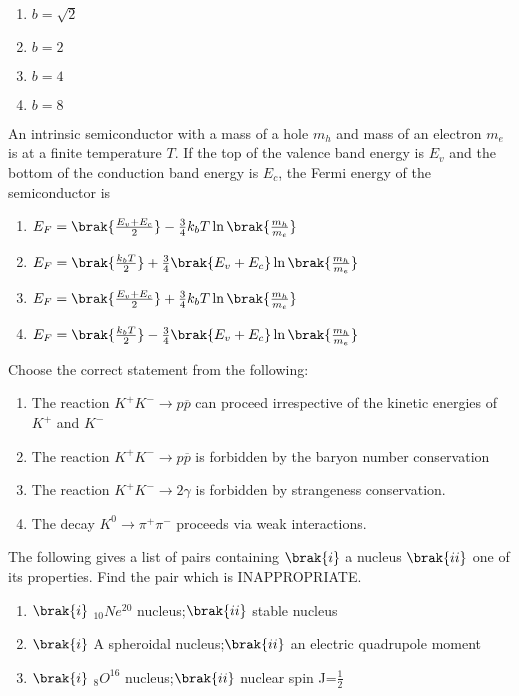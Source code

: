 {{\begin{multicols}{4}
\begin{enumerate}
\item $b=\sqrt{2}$
\item $b=2$
\item $b=4$
\item $b=8$
\end{enumerate}
\end{multicols}
}
\item{
An intrinsic semiconductor with a mass of a hole $m_h$ and mass of an electron $m_e$ is at a finite temperature $T$. If the top of the valence band energy is $E_v$ and the bottom of the conduction band energy is $E_c$, the Fermi energy of the semiconductor is  
\begin{multicols}{2}
\begin{enumerate}
\item $E_F=\brak{\frac{E_v+E_c}{2}}-\frac{3}{4}k_bT\ln\brak{\frac{m_h}{m_e}}$
\item $E_F=\brak{\frac{k_bT}{2}}+\frac{3}{4}\brak{E_v+E_c}\ln\brak{\frac{m_h}{m_e}}$
\item $E_F=\brak{\frac{E_v+E_c}{2}}+\frac{3}{4}k_bT\ln\brak{\frac{m_h}{m_e}}$
\item $E_F=\brak{\frac{k_bT}{2}}-\frac{3}{4}\brak{E_v+E_c}\ln\brak{\frac{m_h}{m_e}}$
\end{enumerate}
\end{multicols}
}
\item{
Choose the correct statement from the following:
\begin{enumerate}
\item The reaction $K^+K^-\rightarrow p\overline{p}$ can proceed irrespective of the kinetic energies of $K^+$ and $K^-$
\item The reaction $K^+K^-\rightarrow p\overline{p}$ is forbidden by the baryon number conservation
\item The reaction $K^+K^-\rightarrow 2\gamma$ is forbidden by strangeness conservation.
\item The decay $K^0\rightarrow\pi^+\pi^-$ proceeds via weak interactions.
\end{enumerate}
}
\item{
The following gives a list of pairs containing $\brak{i}$ a nucleus $\brak{ii}$ one of its properties. Find the pair which is INAPPROPRIATE.
\begin{enumerate}
\item $\brak{i}$ $_{10}Ne^{20}$ nucleus;$\brak{ii}$ stable nucleus 
\item $\brak{i}$ A spheroidal nucleus;$\brak{ii}$ an electric quadrupole moment
\item $\brak{i}$ $_8O^{16}$ nucleus;$\brak{ii}$ nuclear spin J=$\frac{1}{2}$

\end{enumerate}}}
